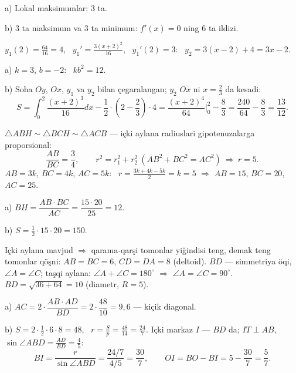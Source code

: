 a) Lokal maksimumlar: $3$ ta.

b) $3$ ta maksimum va $3$ ta minimum: $f'(x)=0$ ning $6$ ta ildizi.

\newpage
{}
$y_1(2)=\frac{64}{16}=4$, \ $y_1'=\frac{3(x+2)^2}{16}$, \ $y_1'(2)=3$: \ $y_2=3(x-2)+4=3x-2$.

a) $k=3$, $b=-2$: \ $kb^2=12$.

b) Soha $Oy$, $Ox$, $y_1$ va $y_2$ bilan çegaralangan; $y_2$ $Ox$ ni $x=\frac23$ da kesadi:
\[S=\int_0^2\frac{(x+2)^3}{16}dx-\frac12\cdot\left(2-\frac23\right)\cdot4=\frac{(x+2)^4}{64}\Big|_0^2-\frac83=\frac{240}{64}-\frac83=\frac{13}{12}.\]

\newpage
{}
$\triangle ABH\sim\triangle BCH\sim\triangle ACB$ — içki aylana radiuslari gipotenuzalarga proporsional:
\[\frac{AB}{BC}=\frac34,\qquad r^2=r_1^2+r_2^2\ \left(AB^2+BC^2=AC^2\right)\ \Rightarrow\ r=5.\]
$AB=3k$, $BC=4k$, $AC=5k$: \ $r=\frac{3k+4k-5k}2=k=5$ $\Rightarrow$ $AB=15$, $BC=20$, $AC=25$.

a) $BH=\dfrac{AB\cdot BC}{AC}=\dfrac{15\cdot20}{25}=12$.

b) $S=\frac12\cdot15\cdot20=150$.

\newpage
{}
Içki aylana mavjud $\Rightarrow$ qarama-qarşi tomonlar yiğindisi teng, demak teng tomonlar qöşni: $AB=BC=6$, $CD=DA=8$ (deltoid). $BD$ — simmetriya öqi, $\angle A=\angle C$; taşqi aylana: $\angle A+\angle C=180^\circ$ $\Rightarrow$ $\angle A=\angle C=90^\circ$.
$BD=\sqrt{36+64}=10$ (diametr, $R=5$).

a) $AC=2\cdot\dfrac{AB\cdot AD}{BD}=2\cdot\dfrac{48}{10}=9{,}6$ — kiçik diagonal.

b) $S=2\cdot\frac12\cdot6\cdot8=48$, \ $r=\frac Sp=\frac{48}{14}=\frac{24}7$. Içki markaz $I$ — $BD$ da; $IT\perp AB$, $\sin\angle ABD=\frac{AD}{BD}=\frac45$:
\[BI=\frac r{\sin\angle ABD}=\frac{24/7}{4/5}=\frac{30}7,\qquad OI=BO-BI=5-\frac{30}7=\frac57.\]

